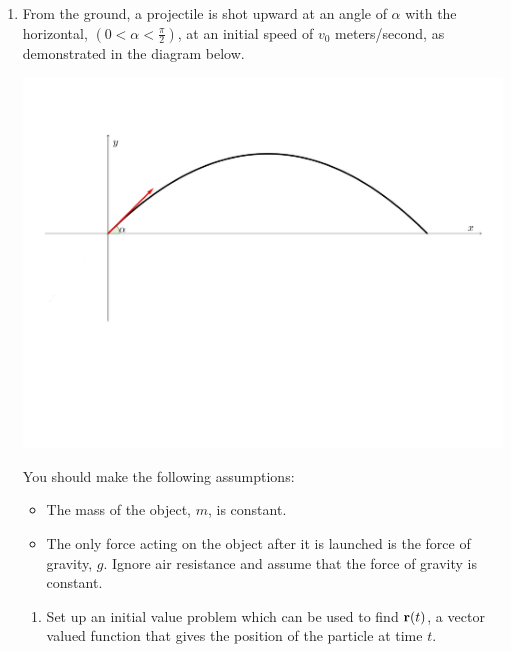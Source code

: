 \documentclass[12pt]{article}
\newif\ifans
\begin{document}
\begin{enumerate}
\begin{enumerate}
\end{enumerate}

\newpage

\item From the ground, a projectile is shot upward at an angle of $\alpha$ with the horizontal, $\left(0<\alpha<\frac{\pi}{2}\right)$, at an initial speed of $v_0$ meters/second, as demonstrated in the diagram below.

\begin{center}
\includegraphics[scale=0.5]{projectile.pdf}
\end{center}

You should make the following assumptions:

\begin{itemize}

\item The mass of the object, $m$, is constant.

\item The only force acting on the object after it is launched is the force of gravity, $g$.  Ignore air resistance and assume that the force of gravity is constant.

\end{itemize}

\begin{enumerate}

\item Set up an initial value problem which can be used to find ${\bf r}(t)$, a vector valued function that gives the position of the particle at time $t$.

\ifans{\fbox{$\left\{\begin{array}{l}
{\bf a}(t)=\frac{d^2{\bf r}}{dt^2}=\langle 0, -g \rangle\\
\\
{\bf v}(0)={\bf r}^{\prime}(0)=\langle v_0\cos{\alpha}, v_0\sin{\alpha} \rangle\\
\\
{\bf r}(0)= \langle 0,0 \rangle\end{array}\right.$}} \fi


\end{enumerate}
\end{enumerate}
\end{document}
